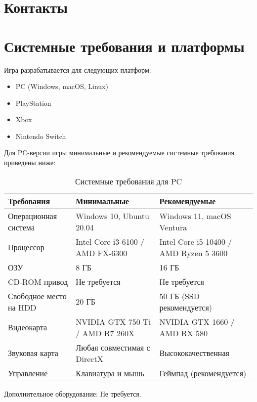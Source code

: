 \documentclass{article}
\begin{document}
\section{Контакты}

\newpage

\section*{Системные требования и платформы}

Игра разрабатывается для следующих платформ:
\begin{itemize}
    \item PC (Windows, macOS, Linux)
    \item PlayStation
    \item Xbox
    \item Nintendo Switch
\end{itemize}

Для PC-версии игры минимальные и рекомендуемые системные требования приведены ниже:

\begin{table}[h!]
\centering
\renewcommand{\arraystretch}{1.5}
\begin{tabular}{|l|l|l|}
\hline
\textbf{Требования}           & \textbf{Минимальные}                        & \textbf{Рекомендуемые}                    \\ \hline
Операционная система          & Windows 10, Ubuntu 20.04                    & Windows 11, macOS Ventura                 \\ \hline
Процессор                     & Intel Core i3-6100 / AMD FX-6300            & Intel Core i5-10400 / AMD Ryzen 5 3600    \\ \hline
ОЗУ                           & 8 ГБ                                        & 16 ГБ                                     \\ \hline
CD-ROM привод                 & Не требуется                               & Не требуется                             \\ \hline
Свободное место на HDD        & 20 ГБ                                       & 50 ГБ (SSD рекомендуется)                \\ \hline
Видеокарта                    & NVIDIA GTX 750 Ti / AMD R7 260X             & NVIDIA GTX 1660 / AMD RX 580             \\ \hline
Звуковая карта                & Любая совместимая с DirectX                 & Высококачественная                       \\ \hline
Управление                    & Клавиатура и мышь                           & Геймпад (рекомендуется)                  \\ \hline
\end{tabular}
\caption{Системные требования для PC}
\end{table}

Дополнительное оборудование: Не требуется.
\end{document}
